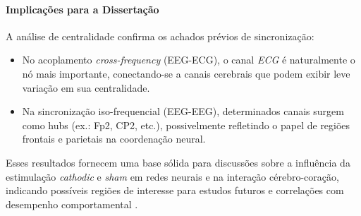 \paragraph{Implicações para a Dissertação}  
A análise de centralidade confirma os achados prévios de sincronização:  
\begin{itemize}
    \item No acoplamento \emph{cross-frequency} (EEG-ECG), o canal \emph{ECG} é naturalmente o nó mais importante, conectando-se a canais cerebrais que podem exibir leve variação em sua centralidade.  
    \item Na sincronização iso-frequencial (EEG-EEG), determinados canais surgem como hubs (ex.: Fp2, CP2, etc.), possivelmente refletindo o papel de regiões frontais e parietais na coordenação neural.  
\end{itemize}
Esses resultados fornecem uma base sólida para discussões sobre a influência da estimulação \emph{cathodic} e \emph{sham} em redes neurais e na interação cérebro-coração, indicando possíveis regiões de interesse para estudos futuros e correlações com desempenho comportamental \cite{bullmore2009complex, rubinov2010complex}.



